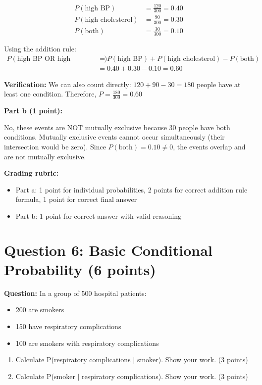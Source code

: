 \documentclass[11pt]{article}
\begin{document}
\begin{align*}
P(\text{high BP}) &= \frac{120}{300} = 0.40\\
P(\text{high cholesterol}) &= \frac{90}{300} = 0.30\\
P(\text{both}) &= \frac{30}{300} = 0.10
\end{align*}

Using the addition rule:
\begin{align*}
P(\text{high BP OR high cholesterol}) &= P(\text{high BP}) + P(\text{high cholesterol}) - P(\text{both})\\
&= 0.40 + 0.30 - 0.10 = 0.60
\end{align*}

\textbf{Verification:} We can also count directly: $120 + 90 - 30 = 180$ people have at least one condition. Therefore, $P = \frac{180}{300} = 0.60$ \checkmark

\textbf{Part b (1 point):}

No, these events are NOT mutually exclusive because 30 people have both conditions. Mutually exclusive events cannot occur simultaneously (their intersection would be zero). Since $P(\text{both}) = 0.10 \neq 0$, the events overlap and are not mutually exclusive.

\textbf{Grading rubric:}
\begin{itemize}
    \item Part a: 1 point for individual probabilities, 2 points for correct addition rule formula, 1 point for correct final answer
    \item Part b: 1 point for correct answer with valid reasoning
\end{itemize}

\vspace{0.3cm}
\noindent\hrulefill

\section*{Question 6: Basic Conditional Probability (6 points)}

\textbf{Question:} In a group of 500 hospital patients:
\begin{itemize}
    \item 200 are smokers
    \item 150 have respiratory complications
    \item 100 are smokers with respiratory complications
\end{itemize}

\begin{enumerate}
    \item[a)] Calculate P(respiratory complications $\mid$ smoker). Show your work. (3 points)
    \item[b)] Calculate P(smoker $\mid$ respiratory complications). Show your work. (3 points)
\end{enumerate}
\end{document}
